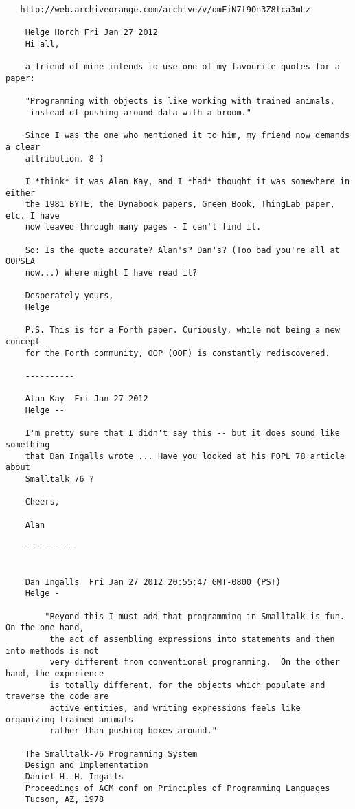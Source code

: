 \begin{verbatim}
   http://web.archiveorange.com/archive/v/omFiN7t9On3Z8tca3mLz 
 
    Helge Horch Fri Jan 27 2012 
    Hi all, 
 
    a friend of mine intends to use one of my favourite quotes for a paper: 
 
    "Programming with objects is like working with trained animals, 
     instead of pushing around data with a broom." 
 
    Since I was the one who mentioned it to him, my friend now demands a clear 
    attribution. 8-) 
 
    I *think* it was Alan Kay, and I *had* thought it was somewhere in either 
    the 1981 BYTE, the Dynabook papers, Green Book, ThingLab paper, etc. I have 
    now leaved through many pages - I can't find it. 
 
    So: Is the quote accurate? Alan's? Dan's? (Too bad you're all at OOPSLA 
    now...) Where might I have read it? 
 
    Desperately yours, 
    Helge 
 
    P.S. This is for a Forth paper. Curiously, while not being a new concept 
    for the Forth community, OOP (OOF) is constantly rediscovered. 
 
    ---------- 
 
    Alan Kay  Fri Jan 27 2012 
    Helge -- 
 
    I'm pretty sure that I didn't say this -- but it does sound like something 
    that Dan Ingalls wrote ... Have you looked at his POPL 78 article about 
    Smalltalk 76 ? 
 
    Cheers, 
 
    Alan 
 
    ---------- 
 
 
    Dan Ingalls  Fri Jan 27 2012 20:55:47 GMT-0800 (PST) 
    Helge - 
 
        "Beyond this I must add that programming in Smalltalk is fun.  On the one hand, 
         the act of assembling expressions into statements and then into methods is not 
         very different from conventional programming.  On the other hand, the experience 
         is totally different, for the objects which populate and traverse the code are 
         active entities, and writing expressions feels like organizing trained animals 
         rather than pushing boxes around." 
 
    The Smalltalk-76 Programming System 
    Design and Implementation 
    Daniel H. H. Ingalls 
    Proceedings of ACM conf on Principles of Programming Languages 
    Tucson, AZ, 1978 
 

\end{verbatim}
